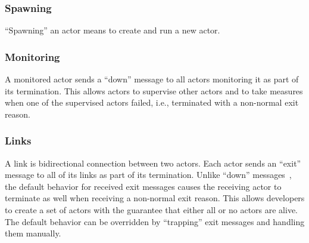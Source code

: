 \subsubsection{Spawning}

``Spawning'' an actor means to create and run a new actor.

\subsubsection{Monitoring}
\label{sec:monitoring}

A monitored actor sends a ``down'' message to all actors monitoring it as part of its termination.
This allows actors to supervise other actors and to take measures when one of the supervised actors failed, i.e., terminated with a non-normal exit reason.

\subsubsection{Links}

A link is bidirectional connection between two actors.
Each actor sends an ``exit'' message to all of its links as part of its termination.
Unlike ``down'' messages~, the default behavior for received exit messages causes the receiving actor to terminate as well when receiving a non-normal exit reason.
This allows developers to create a set of actors with the guarantee that either all or no actors are alive.
The default behavior can be overridden by ``trapping'' exit messages and handling them manually.